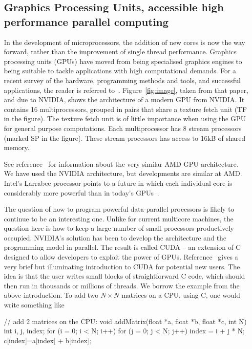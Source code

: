 \subsection{Graphics Processing Units, accessible high performance parallel computing}
\label{sec:gpu}

In the development of microprocessors, the addition of new cores is now the
way forward, rather than the improvement of single thread performance.
Graphics processing units (GPUs) have moved from being specialised graphics
engines to being suitable to tackle applications with high computational
demands. For a recent survey of the hardware, programming methods and tools,
and successful applications, the reader is referred to~\cite{GPUComputing}.
Figure~\ref{fig:image}, taken from that paper, and due to NVIDIA, shows the
architecture of a modern GPU from NVIDIA. It contains 16 multiprocessors, 
grouped in pairs that share a texture fetch unit (TF in the figure). The 
texture fetch unit is of little importance when using the GPU for general 
purpose computations. Each multiprocessor has 8 stream processors (marked 
SP in the figure). These stream processors has access to 16kB of shared memory.  

See reference~\cite{GPUComputing} for information about
the very similar AMD GPU architecture. We have used the NVIDIA architecture,
but developments are similar at AMD. Intel's Larrabee processor points to a
future in which each individual core is considerably more powerful than in
today's GPUs~\cite{IntelLarrabee}.


The question of how to program powerful data-parallel processors is likely
to continue to be an interesting one. Unlike for current multicore machines,
the question here is how to keep a large number of small processors
productively occupied. NVIDIA's solution has been to develop the
architecture and the programming model in parallel. The result is called
CUDA -- an extension of C designed to allow developers to exploit the power
of GPUs. Reference~\cite{GPUCudaLuebke} gives a very brief but illuminating
introduction to CUDA for potential new users. The idea is that the user
writes small blocks of straightforward C code, which should then run in
thousands or millions of threads. We borrow the example from the above
introduction. To add two $N \times N$ matrices on a CPU, using C, one would
write something like

\begin{code}
// add 2 matrices on the CPU:
void addMatrix(float *a, float *b, float *c, int N)
{
  int i, j, index;
  for (i = 0; i < N; i++) {
    for (j = 0; j < N; j++) {
      index = i + j * N;
      c[index]=a[index] + b[index];
    }
  }
}
\end{code}
\FloatBarrier

